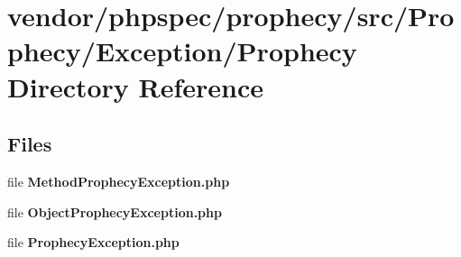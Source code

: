 \section{vendor/phpspec/prophecy/src/\+Prophecy/\+Exception/\+Prophecy Directory Reference}
\label{dir_2fadd1ee084ca7b526e16fbcdb25c557}
\subsection*{Files}
\begin{DoxyCompactItemize}
\item 
file {\bf Method\+Prophecy\+Exception.\+php}
\item 
file {\bf Object\+Prophecy\+Exception.\+php}
\item 
file {\bf Prophecy\+Exception.\+php}
\end{DoxyCompactItemize}
